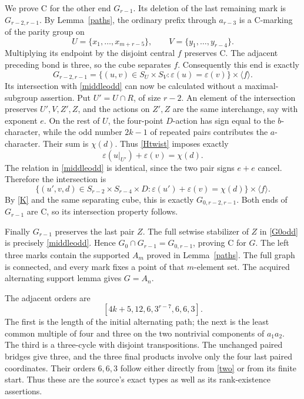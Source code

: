\documentclass[11pt]{article}
\newcommand{\gen}[1]{\langle#1\rangle}
\newcommand{\eps}{\varepsilon}
\begin{document}
We prove C for the other end $G_{r-1}$. Its deletion of the last
remaining mark is $G_{r-2,r-1}$. By Lemma~\ref{paths}, the
ordinary prefix through $a_{r-3}$ is a C-marking of the parity
group on
\[
 U=\{x_1,\ldots,x_{m+r-5}\},\qquad
 V=\{y_1,\ldots,y_{r-4}\}.
\]
Multiplying its endpoint by the disjoint central $f$ preserves C.
The adjacent preceding bond is three, so the cube separates $f$.
Consequently this end is exactly
\begin{equation}\label{Htwist}
 G_{r-2,r-1}=\{(u,v)\in S_U\times S_V:
                             \eps(u)=\eps(v)\}\times\gen f.
\end{equation}
Its intersection with \eqref{middleodd} can now be calculated
without a maximal-subgroup assertion. Put
$U'=U\cap R$, of size $r-2$. An element of the intersection
preserves $U',V,Z',Z$, and the actions on $Z',Z$ are the same
interchange, say with exponent $e$. On the rest of $U$, the
four-point $D$-action has sign equal to the $b$-character, while
the odd number $2k-1$ of repeated pairs contributes the
$a$-character. Their sum is $\chi(d)$. Thus \eqref{Htwist}
imposes exactly
\[
 \eps(u|_{U'})+\eps(v)=\chi(d).
\]
The relation in \eqref{middleodd} is identical, since the two
pair signs $e+e$ cancel. Therefore the intersection is
\begin{equation}\label{oddintersection}
 \{(u',v,d)\in S_{r-2}\times S_{r-4}\times D:
              \eps(u')+\eps(v)=\chi(d)\}\times\gen f.
\end{equation}
By \eqref{K} and the same separating cube, this is exactly
$G_{0,r-2,r-1}$. Both ends of $G_{r-1}$ are C, so its
intersection property follows.

Finally $G_{r-1}$ preserves the last pair $Z$. The full setwise
stabilizer of $Z$ in \eqref{G0odd} is precisely
\eqref{middleodd}. Hence
$G_0\cap G_{r-1}=G_{0,r-1}$, proving C for $G$.
The left three marks contain the supported $A_m$ proved in
Lemma~\ref{paths}. The full graph is connected, and every mark
fixes a point of that $m$-element set. The acquired alternating
support lemma gives $G=A_n$.

The adjacent orders are
\begin{equation}\label{oddtype}
 [4k+5,12,6,3^{r-7},6,6,3].
\end{equation}
The first is the length of the initial alternating path; the next
is the least common multiple of four and three on the two
nontrivial components of $a_1a_2$. The third is a three-cycle
with disjoint transpositions. The unchanged paired bridges give
three, and the three final products involve only the four last
paired coordinates. Their orders $6,6,3$ follow either directly
from \eqref{two} or from its finite start. Thus these are the
source's exact types as well as its rank-existence assertions.
\end{document}
